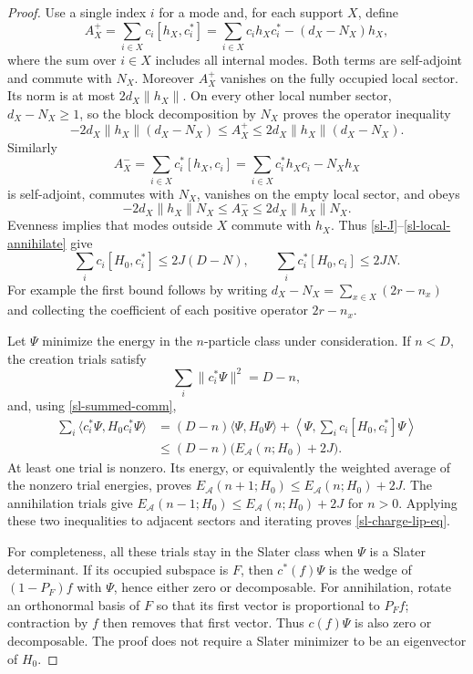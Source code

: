 \begin{proof}
Use a single index \(i\) for a mode and, for each support \(X\), define
\[
A_X^+=\sum_{i\in X}c_i[h_X,c_i^*]
       =\sum_{i\in X}c_ih_Xc_i^*-(d_X-N_X)h_X,
\]
where the sum over \(i\in X\) includes all internal modes. Both terms are
self-adjoint and commute with \(N_X\). Moreover \(A_X^+\) vanishes on
the fully occupied local sector. Its norm is at most
\(2d_X\|h_X\|\). On every other local number sector,
\(d_X-N_X\ge1\), so the block decomposition by \(N_X\) proves the
operator inequality
\begin{equation}
-2d_X\|h_X\|(d_X-N_X)
\le A_X^+\le 2d_X\|h_X\|(d_X-N_X).
\label{sl-local-create}
\end{equation}
Similarly
\[
A_X^-=\sum_{i\in X}c_i^*[h_X,c_i]
       =\sum_{i\in X}c_i^*h_Xc_i-N_Xh_X
\]
is self-adjoint, commutes with \(N_X\), vanishes on the empty local
sector, and obeys
\begin{equation}
-2d_X\|h_X\|N_X\le A_X^-\le 2d_X\|h_X\|N_X.
\label{sl-local-annihilate}
\end{equation}
Evenness implies that modes outside \(X\) commute with \(h_X\). Thus
\eqref{sl-J}--\eqref{sl-local-annihilate} give
\begin{equation}
\sum_i c_i[H_0,c_i^*]\le 2J(D-N),
\qquad
\sum_i c_i^*[H_0,c_i]\le 2JN.
\label{sl-summed-comm}
\end{equation}
For example the first bound follows by writing
\(d_X-N_X=\sum_{x\in X}(2r-n_x)\) and collecting the coefficient
of each positive operator \(2r-n_x\).

Let \(\Psi\) minimize the energy in the \(n\)-particle class under
consideration. If \(n<D\), the creation trials satisfy
\[
\sum_i\|c_i^*\Psi\|^2=D-n,
\]
and, using \eqref{sl-summed-comm},
\begin{align*}
\sum_i\langle c_i^*\Psi,H_0c_i^*\Psi\rangle
&=(D-n)\langle\Psi,H_0\Psi\rangle
 +\left\langle\Psi,\sum_i c_i[H_0,c_i^*]\Psi\right\rangle\\
&\le(D-n)\bigl(E_{\mathcal A}(n;H_0)+2J\bigr).
\end{align*}
At least one trial is nonzero. Its energy, or equivalently the weighted
average of the nonzero trial energies, proves
\(E_{\mathcal A}(n+1;H_0)\le E_{\mathcal A}(n;H_0)+2J\).
The annihilation trials give
\(E_{\mathcal A}(n-1;H_0)\le E_{\mathcal A}(n;H_0)+2J\) for \(n>0\).
Applying these two inequalities to adjacent sectors and iterating proves
\eqref{sl-charge-lip-eq}.

For completeness, all these trials stay in the Slater class when
\(\Psi\) is a Slater determinant. If its occupied subspace is \(F\),
then \(c^*(f)\Psi\) is the wedge of \((1-P_F)f\) with \(\Psi\),
hence either zero or decomposable. For annihilation, rotate an
orthonormal basis of \(F\) so that its first vector is proportional
to \(P_Ff\); contraction by \(f\) then removes that first vector.
Thus \(c(f)\Psi\) is also zero or decomposable. The proof does not
require a Slater minimizer to be an eigenvector of \(H_0\).
\end{proof}

